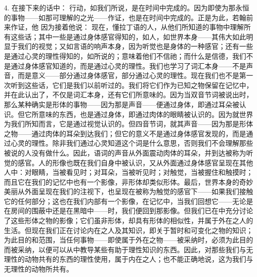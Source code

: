4. 在接下来的话中： 行动，如我们所说，是在时间中完成的。因为即使为那永恒的事物——如那可理解的之光——作证，也是在时间中完成的。正是为此，若翰前来作证，他 因为接着他说： 现在，懂拉丁语的人，从他们所知道的事物中理解所有这些话；其中一些是通过身体感官得知的，如人，如世界本身——其伟大如此明显于我们的视觉；又如言语的响声本身，因为听觉也是身体的一种感官；还有一些是通过心灵的理性得知的，如所说的；意味着他们不信祂；而什么是信德，我们不是通过身体感官知道的，而是通过心灵的理性。我们也学习了词汇本身——不是声音，而是意义——部分通过身体感官，部分通过心灵的理性。现在我们也不是第一次听到这些话，它们是我们以前听过的。我们将它们作为已知之物保留在记忆中，并在此认出了，不仅是词汇本身，还有它们所意味的。因为当双音节词被说出时，那么某种确实是形体的事物——因为那是声音——便通过身体，即通过耳朵被认识。但它所意味的东西，也是通过身体，即通过肉体的眼睛被认识的。因为就世界为我们所知而言，它是通过视觉认识的。但四音节词，就其声音——因为那是形体之物——通过肉体的耳朵到达我们；但它的意义不是通过身体感官发现的，而是通过心灵的理性。除非我们通过心灵知道这个词是什么意思，否则我们不会理解那些被说的人没有做什么。因此，语词的声音从外面震动肉体的耳朵，并到达被称为听觉的感官。人的形像也既在我们自身中被认识，又从外面通过身体感官呈现在其他人中：对眼睛，当被看见时；对耳朵，当被听见时；对触觉，当被握住和触摸时；而且它在我们的记忆中也有一个影像，非形体却类似形体。最后，世界本身的奇妙美丽从外面呈现在我们的注视下，也呈现在被称为触觉的感官下——如果我们接触它的任何部分；这也在我们内部有一个影像，在记忆中，当我们回想它——无论是在房间的围蔽中还是在黑暗中——时，我们便回到那影像。但我们已在中充分讨论了这些形体之物的影像；它们虽非形体，却具有形体的相似性，并属于外在之人的生活。但现在我们正在讨论内在之人及其知识，即关于暂时和可变化之物的知识；为此目的和范围，当任何事物——即使属于外在之物——被采纳时，必须为此目的而被采纳，以便可以从中教导某些有助于理性知识的东西。因此，对那些我们与无理性的动物共有的东西的理性使用，属于内在之人；也不能正确地说，这为我们与无理性的动物所共有。\par


